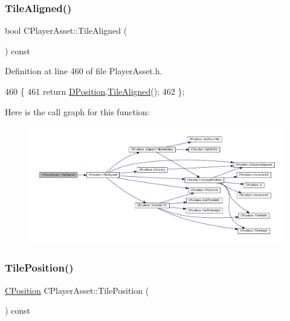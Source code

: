 \subsubsection{\texorpdfstring{Tile\+Aligned()}{TileAligned()}}
{\footnotesize\ttfamily bool C\+Player\+Asset\+::\+Tile\+Aligned (\begin{DoxyParamCaption}{ }\end{DoxyParamCaption}) const\hspace{0.3cm}{\ttfamily [inline]}}



Definition at line 460 of file Player\+Asset.\+h.


\begin{DoxyCode}
460                                 \{
461             \textcolor{keywordflow}{return} \hyperlink{classCPlayerAsset_aa9f53c009b181c7c5647c6b03776a04c}{DPosition}.\hyperlink{classCPosition_abe4ef039d9bbf51cd542167b5a0cd88e}{TileAligned}();  
462         \};
\end{DoxyCode}
Here is the call graph for this function\+:\nopagebreak
\begin{figure}[H]
\begin{center}
\leavevmode
\includegraphics[width=350pt]{classCPlayerAsset_aaaea60176986f3e4f464bf5cec056521_cgraph}
\end{center}
\end{figure}
\hypertarget{classCPlayerAsset_a23354232e5585574bc8e12c1fdb37ad9}{}\label{classCPlayerAsset_a23354232e5585574bc8e12c1fdb37ad9} 
\subsubsection{\texorpdfstring{Tile\+Position()}{TilePosition()}\hspace{0.1cm}{\footnotesize\ttfamily [1/2]}}
{\footnotesize\ttfamily \hyperlink{classCPosition}{C\+Position} C\+Player\+Asset\+::\+Tile\+Position (\begin{DoxyParamCaption}{ }\end{DoxyParamCaption}) const\hspace{0.3cm}{\ttfamily [inline]}}



